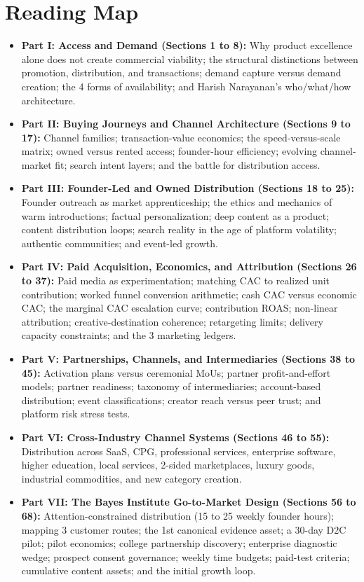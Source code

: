 \section*{Reading Map}

\begin{itemize}[leftmargin=*,itemsep=1pt]
  \item \textbf{Part I: Access and Demand (Sections 1 to 8):} Why product excellence alone does not create commercial viability; the structural distinctions between promotion, distribution, and transactions; demand capture versus demand creation; the 4 forms of availability; and Harish Narayanan's who/what/how architecture.
  \item \textbf{Part II: Buying Journeys and Channel Architecture (Sections 9 to 17):} Channel families; transaction-value economics; the speed-versus-scale matrix; owned versus rented access; founder-hour efficiency; evolving channel-market fit; search intent layers; and the battle for distribution access.
  \item \textbf{Part III: Founder-Led and Owned Distribution (Sections 18 to 25):} Founder outreach as market apprenticeship; the ethics and mechanics of warm introductions; factual personalization; deep content as a product; content distribution loops; search reality in the age of platform volatility; authentic communities; and event-led growth.
  \item \textbf{Part IV: Paid Acquisition, Economics, and Attribution (Sections 26 to 37):} Paid media as experimentation; matching CAC to realized unit contribution; worked funnel conversion arithmetic; cash CAC versus economic CAC; the marginal CAC escalation curve; contribution ROAS; non-linear attribution; creative-destination coherence; retargeting limits; delivery capacity constraints; and the 3 marketing ledgers.
  \item \textbf{Part V: Partnerships, Channels, and Intermediaries (Sections 38 to 45):} Activation plans versus ceremonial MoUs; partner profit-and-effort models; partner readiness; taxonomy of intermediaries; account-based distribution; event classifications; creator reach versus peer trust; and platform risk stress tests.
  \item \textbf{Part VI: Cross-Industry Channel Systems (Sections 46 to 55):} Distribution across SaaS, CPG, professional services, enterprise software, higher education, local services, 2-sided marketplaces, luxury goods, industrial commodities, and new category creation.
  \item \textbf{Part VII: The Bayes Institute Go-to-Market Design (Sections 56 to 68):} Attention-constrained distribution (15 to 25 weekly founder hours); mapping 3 customer routes; the 1st canonical evidence asset; a 30-day D2C pilot; pilot economics; college partnership discovery; enterprise diagnostic wedge; prospect consent governance; weekly time budgets; paid-test criteria; cumulative content assets; and the initial growth loop.

\end{itemize}
